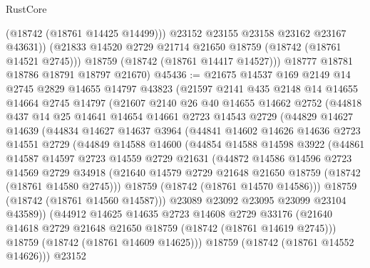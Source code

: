 \begin{lexlean}{RustCore}
\begin{coremodule}
              (@18742 (@18761 @14425 @14499)))
            @23152
            @23155
            @23158
            @23162
            @23167
            @43631))
        (@21833 @14520 @2729 @21714 @21650 @18759 (@18742 (@18761 @14521 @2745)))
        @18759
        (@18742 (@18761 @14417 @14527)))
      @18777
      @18781
      @18786
      @18791
      @18797
      @21670)
@45436 := @21675
    @14537
    @169
    @2149
    @14
    @2745
    @2829
    @14655
    @14797
    @43823
    (@21597
      @2141
      @435
      @2148
      @14
      @14655
      @14664
      @2745
      @14797
      (@21607
        @2140
        @26
        @40
        @14655
        @14662
        @2752
        (@44818
          @437
          @14
          @25
          @14641
          @14654
          @14661
          @2723
          @14543
          @2729
          (@44829
            @14627
            @14639
            (@44834
              @14627
              @14637
              @3964
              (@44841
                @14602
                @14626
                @14636
                @2723
                @14551
                @2729
                (@44849
                  @14588
                  @14600
                  (@44854
                    @14588
                    @14598
                    @3922
                    (@44861
                      @14587
                      @14597
                      @2723
                      @14559
                      @2729
                      @21631
                      (@44872
                        @14586
                        @14596
                        @2723
                        @14569
                        @2729
                        @34918
                        (@21640 @14579 @2729 @21648 @21650 @18759 (@18742 (@18761 @14580 @2745)))
                        @18759
                        (@18742 (@18761 @14570 @14586)))
                      @18759
                      (@18742 (@18761 @14560 @14587)))
                    @23089
                    @23092
                    @23095
                    @23099
                    @23104
                    @43589))
                (@44912
                  @14625
                  @14635
                  @2723
                  @14608
                  @2729
                  @33176
                  (@21640 @14618 @2729 @21648 @21650 @18759 (@18742 (@18761 @14619 @2745)))
                  @18759
                  (@18742 (@18761 @14609 @14625)))
                @18759
                (@18742 (@18761 @14552 @14626)))
              @23152

\end{coremodule}
\end{lexlean}
